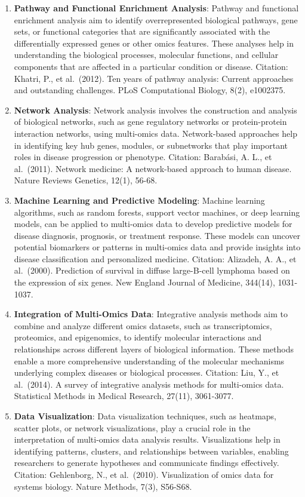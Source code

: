 \documentclass[a4paper, nobind]{templates/ociamthesis}
\begin{document}
\begin{enumerate}
\def\labelenumi{\arabic{enumi}.}
\item
  \textbf{Pathway and Functional Enrichment Analysis}: Pathway and functional enrichment analysis aim to identify overrepresented biological pathways, gene sets, or functional categories that are significantly associated with the differentially expressed genes or other omics features. These analyses help in understanding the biological processes, molecular functions, and cellular components that are affected in a particular condition or disease. Citation: Khatri, P., et al.~(2012). Ten years of pathway analysis: Current approaches and outstanding challenges. PLoS Computational Biology, 8(2), e1002375.
\item
  \textbf{Network Analysis}: Network analysis involves the construction and analysis of biological networks, such as gene regulatory networks or protein-protein interaction networks, using multi-omics data. Network-based approaches help in identifying key hub genes, modules, or subnetworks that play important roles in disease progression or phenotype. Citation: Barabási, A. L., et al.~(2011). Network medicine: A network-based approach to human disease. Nature Reviews Genetics, 12(1), 56-68.
\item
  \textbf{Machine Learning and Predictive Modeling}: Machine learning algorithms, such as random forests, support vector machines, or deep learning models, can be applied to multi-omics data to develop predictive models for disease diagnosis, prognosis, or treatment response. These models can uncover potential biomarkers or patterns in multi-omics data and provide insights into disease classification and personalized medicine. Citation: Alizadeh, A. A., et al.~(2000). Prediction of survival in diffuse large-B-cell lymphoma based on the expression of six genes. New England Journal of Medicine, 344(14), 1031-1037.
\item
  \textbf{Integration of Multi-Omics Data}: Integrative analysis methods aim to combine and analyze different omics datasets, such as transcriptomics, proteomics, and epigenomics, to identify molecular interactions and relationships across different layers of biological information. These methods enable a more comprehensive understanding of the molecular mechanisms underlying complex diseases or biological processes. Citation: Liu, Y., et al.~(2014). A survey of integrative analysis methods for multi-omics data. Statistical Methods in Medical Research, 27(11), 3061-3077.
\item
  \textbf{Data Visualization}: Data visualization techniques, such as heatmaps, scatter plots, or network visualizations, play a crucial role in the interpretation of multi-omics data analysis results. Visualizations help in identifying patterns, clusters, and relationships between variables, enabling researchers to generate hypotheses and communicate findings effectively. Citation: Gehlenborg, N., et al.~(2010). Visualization of omics data for systems biology. Nature Methods, 7(3), S56-S68.
\end{enumerate}
\end{document}
